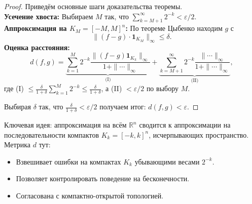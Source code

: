 \documentclass[../NDCNNAI_main.tex]{subfiles}
\begin{document}
\begin{proof}
    Приведём основные шаги доказательства теоремы.\\
    \textbf{Усечение хвоста:} Выбираем $M$ так, что $\sum_{k=M+1}^\infty 2^{-k} < \varepsilon/2$.\\
    \textbf{Аппроксимация на $K_M = [-M, M]^n$:} По теореме Цыбенко находим $g$ с
    \[
    \| (f - g) \cdot \mathbf{1}_{K_M} \|_\infty \leq \delta.
    \]
    \textbf{Оценка расстояния:}
    \[
    d(f, g) = \underbrace{\sum_{k=1}^M 2^{-k} \frac{\| (f - g)\mathbf{1}_{K_k} \|_\infty}{1 + \| \cdots \|_\infty}}_{\text{(I)}} + 
    \underbrace{\sum_{k=M+1}^\infty 2^{-k} \frac{\| \cdots \|_\infty}{1 + \| \cdots \|_\infty}}_{\text{(II)}},
    \]
    где (I) $\leq \frac{\delta}{1+\delta} \sum_{k=1}^M 2^{-k} \leq \frac{\delta}{1+\delta}$, а (II) $< \varepsilon/2$ по выбору $M$.
    
    Выбирая $\delta$ так, что $\frac{\delta}{1+\delta} < \varepsilon/2$ получаем итог: $d(f, g) < \varepsilon$.

\end{proof}

\begin{remark}
Ключевая идея: аппроксимация на всём $\mathbb{R}^n$ сводится к аппроксимации на последовательности компактов $K_k = [-k, k]^n$, исчерпывающих пространство. Метрика $d$ тут:
\begin{itemize}
    \item Взвешивает ошибки на компактах $K_k$ убывающими весами $2^{-k}$.
    \item Позволяет контролировать поведение на бесконечности.
    \item Согласована с компактно-открытой топологией.
\end{itemize}
\end{remark}
\end{document}
